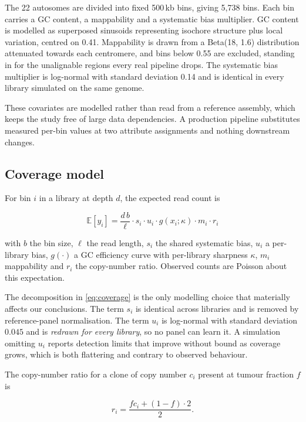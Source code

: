 \documentclass[conference]{IEEEtran}
\begin{document}
The 22 autosomes are divided into fixed 500\,kb bins, giving 5{,}738 bins.
Each bin carries a GC content, a mappability and a systematic bias multiplier.
GC content is modelled as superposed sinusoids representing isochore structure
plus local variation, centred on 0.41. Mappability is drawn from a
Beta(18, 1.6) distribution attenuated towards each centromere, and bins below
0.55 are excluded, standing in for the unalignable regions every real pipeline
drops. The systematic bias multiplier is log-normal with standard deviation
0.14 and is identical in every library simulated on the same genome.

These covariates are modelled rather than read from a reference assembly, which
keeps the study free of large data dependencies. A production pipeline
substitutes measured per-bin values at two attribute assignments and nothing
downstream changes.

\subsection{Coverage model}

For bin $i$ in a library at depth $d$, the expected read count is

\begin{equation}
\mathbb{E}[y_i] = \frac{d \, b}{\ell} \cdot s_i \cdot u_i \cdot g(x_i;\kappa)
\cdot m_i \cdot r_i
\label{eq:coverage}
\end{equation}

with $b$ the bin size, $\ell$ the read length, $s_i$ the shared systematic
bias, $u_i$ a per-library bias, $g(\cdot)$ a GC efficiency curve with
per-library sharpness $\kappa$, $m_i$ mappability and $r_i$ the copy-number
ratio. Observed counts are Poisson about this expectation.

The decomposition in \eqref{eq:coverage} is the only modelling choice that
materially affects our conclusions. The term $s_i$ is identical across
libraries and is removed by reference-panel normalisation. The term $u_i$ is
log-normal with standard deviation $0.045$ and is \emph{redrawn for every
library}, so no panel can learn it. A simulation omitting $u_i$ reports
detection limits that improve without bound as coverage grows, which is both
flattering and contrary to observed behaviour.

The copy-number ratio for a clone of copy number $c_i$ present at tumour
fraction $f$ is

\begin{equation}
r_i = \frac{f c_i + (1-f) \cdot 2}{2}.
\label{eq:mixture}
\end{equation}
\end{document}
